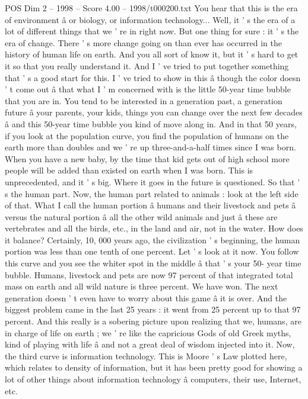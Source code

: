 \begin{textsample}{POS Dim 2 – 1998 – Score 4.00 – 1998/t000200.txt}  \label{ex:f2_pos_066}
You hear that this is the era of environment â or biology, or information technology...
Well, it ' s the era of a lot of different things that we ' re in right now.
But one thing for sure : it ' s the era of change.
There ' s more change going on than ever has occurred in the history of human life on earth.
And you all sort of know it, but it ' s hard to get it so that you really understand it.
And I ' ve tried to put together something that ' s a good start for this.
I ' ve tried to show in this â though the color doesn ' t come out â that what I ' m concerned with is the little 50-year time bubble that you are in.
You tend to be interested in a generation past, a generation future â your parents, your kids, things you can change over the next few decades â and this 50-year time bubble you kind of move along in.
And in that 50 years, if you look at the population curve, you find the population of humans on the earth more than doubles and we ' re up three-and-a-half times since I was born.
When you have a new baby, by the time that kid gets out of high school more people will be added than existed on earth when I was born.
This is unprecedented, and it ' s big.
Where it goes in the future is questioned.
So that ' s the human part.
Now, the human part related to animals : look at the left side of that.
What I call the human portion â humans and their livestock and pets â versus the natural portion â all the other wild animals and just â these are vertebrates and all the birds, etc., in the land and air, not in the water.
How does it balance?
Certainly, 10, 000 years ago, the civilization ' s beginning, the human portion was less than one tenth of one percent.
Let ' s look at it now.
You follow this curve and you see the whiter spot in the middle â that ' s your 50- year time bubble.
Humans, livestock and pets are now 97 percent of that integrated total mass on earth and all wild nature is three percent.
We have won.
The next generation doesn ' t even have to worry about this game â it is over.
And the biggest problem came in the last 25 years : it went from 25 percent up to that 97 percent.
And this really is a sobering picture upon realizing that we, humans, are in charge of life on earth ; we ' re like the capricious Gods of old Greek myths, kind of playing with life â and not a great deal of wisdom injected into it.
Now, the third curve is information technology.
This is Moore ' s Law plotted here, which relates to density of information, but it has been pretty good for showing a lot of other things about information technology â computers, their use, Internet, etc.

\end{textsample}
